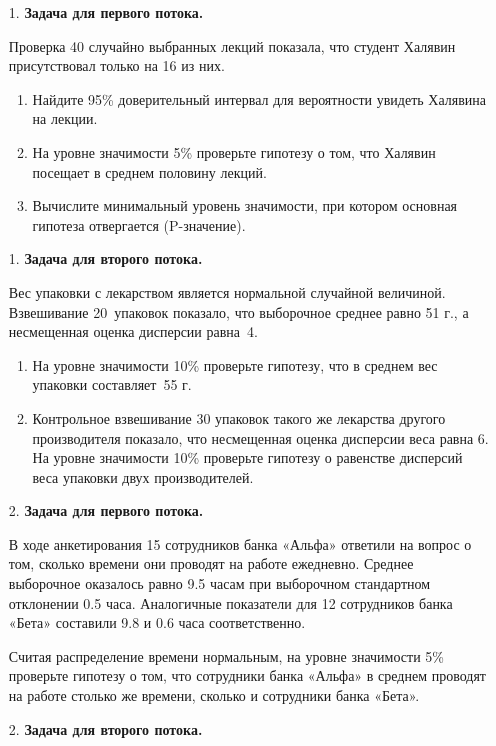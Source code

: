 \begin{enumerate}

\item[1.] \textbf{Задача для первого потока.}

Проверка  40 случайно выбранных лекций показала, что студент Халявин присутствовал только на 16 из них.
\begin{enumerate}
\item Найдите 95\% доверительный интервал для вероятности увидеть Халявина на лекции.
\item На уровне значимости 5\% проверьте гипотезу о том, что Халявин посещает в среднем половину лекций.
\item Вычислите минимальный уровень значимости, при котором основная гипотеза отвергается (P-значение).
\end{enumerate}

\item[1.] \textbf{Задача для второго потока.}

Вес упаковки с лекарством является нормальной случайной величиной.
Взвешивание 20~упаковок показало, что выборочное среднее равно 51 г., а  несмещенная оценка дисперсии равна~4.
\begin{enumerate}
\item На уровне значимости 10\% проверьте гипотезу, что в среднем вес упаковки составляет~55 г.
\item Контрольное взвешивание 30 упаковок такого же лекарства другого производителя показало, что несмещенная оценка дисперсии веса равна 6. На уровне значимости 10\% проверьте гипотезу о равенстве дисперсий веса упаковки двух производителей.
\end{enumerate}

\item[2.] \textbf{Задача для первого потока.}

В ходе анкетирования  15 сотрудников банка «Альфа» ответили на вопрос о том,
сколько времени они проводят на работе ежедневно.
Среднее выборочное оказалось равно 9.5 часам при выборочном стандартном отклонении 0.5 часа.
Аналогичные показатели для 12 сотрудников банка «Бета» составили 9.8 и 0.6 часа соответственно.

Считая распределение времени нормальным, на уровне значимости 5\% проверьте гипотезу о том,
что сотрудники банка «Альфа» в среднем проводят на работе столько же времени, сколько и сотрудники банка «Бета».

\item[2.] \textbf{Задача для второго потока.}



\end{enumerate}
